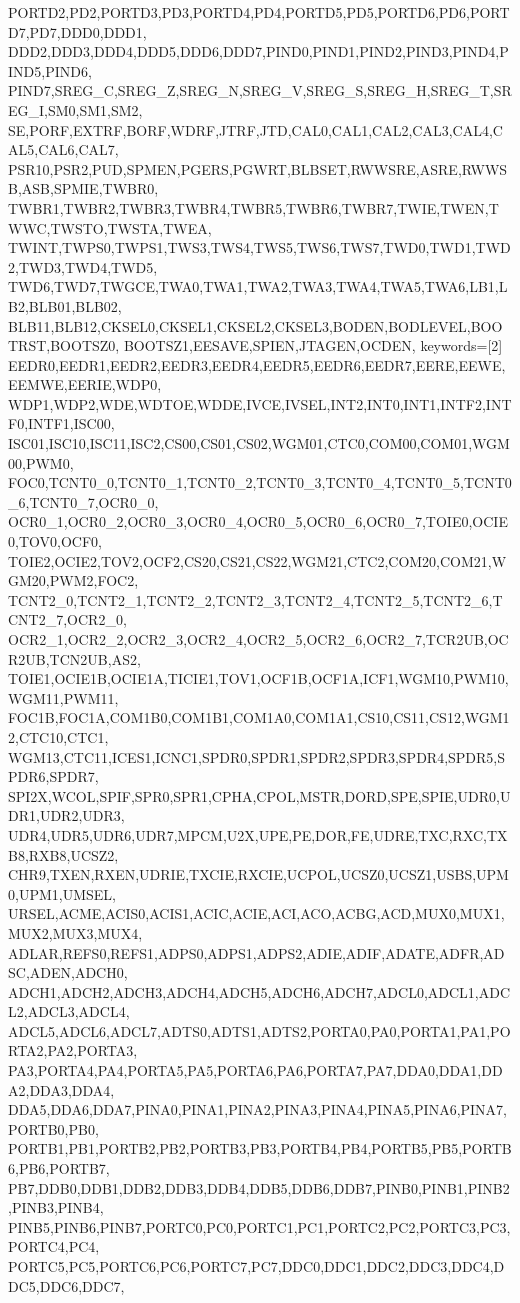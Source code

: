{{    PORTD2,PD2,PORTD3,PD3,PORTD4,PD4,PORTD5,PD5,PORTD6,PD6,PORTD7,PD7,DDD0,DDD1,
    DDD2,DDD3,DDD4,DDD5,DDD6,DDD7,PIND0,PIND1,PIND2,PIND3,PIND4,PIND5,PIND6,
    PIND7,SREG_C,SREG_Z,SREG_N,SREG_V,SREG_S,SREG_H,SREG_T,SREG_I,SM0,SM1,SM2,
    SE,PORF,EXTRF,BORF,WDRF,JTRF,JTD,CAL0,CAL1,CAL2,CAL3,CAL4,CAL5,CAL6,CAL7,
    PSR10,PSR2,PUD,SPMEN,PGERS,PGWRT,BLBSET,RWWSRE,ASRE,RWWSB,ASB,SPMIE,TWBR0,
    TWBR1,TWBR2,TWBR3,TWBR4,TWBR5,TWBR6,TWBR7,TWIE,TWEN,TWWC,TWSTO,TWSTA,TWEA,
    TWINT,TWPS0,TWPS1,TWS3,TWS4,TWS5,TWS6,TWS7,TWD0,TWD1,TWD2,TWD3,TWD4,TWD5,
    TWD6,TWD7,TWGCE,TWA0,TWA1,TWA2,TWA3,TWA4,TWA5,TWA6,LB1,LB2,BLB01,BLB02,
    BLB11,BLB12,CKSEL0,CKSEL1,CKSEL2,CKSEL3,BODEN,BODLEVEL,BOOTRST,BOOTSZ0,
    BOOTSZ1,EESAVE,SPIEN,JTAGEN,OCDEN},
    keywords=[2]
    {EEDR0,EEDR1,EEDR2,EEDR3,EEDR4,EEDR5,EEDR6,EEDR7,EERE,EEWE,EEMWE,EERIE,WDP0,
    WDP1,WDP2,WDE,WDTOE,WDDE,IVCE,IVSEL,INT2,INT0,INT1,INTF2,INTF0,INTF1,ISC00,
    ISC01,ISC10,ISC11,ISC2,CS00,CS01,CS02,WGM01,CTC0,COM00,COM01,WGM00,PWM0,
    FOC0,TCNT0_0,TCNT0_1,TCNT0_2,TCNT0_3,TCNT0_4,TCNT0_5,TCNT0_6,TCNT0_7,OCR0_0,
    OCR0_1,OCR0_2,OCR0_3,OCR0_4,OCR0_5,OCR0_6,OCR0_7,TOIE0,OCIE0,TOV0,OCF0,
    TOIE2,OCIE2,TOV2,OCF2,CS20,CS21,CS22,WGM21,CTC2,COM20,COM21,WGM20,PWM2,FOC2,
    TCNT2_0,TCNT2_1,TCNT2_2,TCNT2_3,TCNT2_4,TCNT2_5,TCNT2_6,TCNT2_7,OCR2_0,
    OCR2_1,OCR2_2,OCR2_3,OCR2_4,OCR2_5,OCR2_6,OCR2_7,TCR2UB,OCR2UB,TCN2UB,AS2,
    TOIE1,OCIE1B,OCIE1A,TICIE1,TOV1,OCF1B,OCF1A,ICF1,WGM10,PWM10,WGM11,PWM11,
    FOC1B,FOC1A,COM1B0,COM1B1,COM1A0,COM1A1,CS10,CS11,CS12,WGM12,CTC10,CTC1,
    WGM13,CTC11,ICES1,ICNC1,SPDR0,SPDR1,SPDR2,SPDR3,SPDR4,SPDR5,SPDR6,SPDR7,
    SPI2X,WCOL,SPIF,SPR0,SPR1,CPHA,CPOL,MSTR,DORD,SPE,SPIE,UDR0,UDR1,UDR2,UDR3,
    UDR4,UDR5,UDR6,UDR7,MPCM,U2X,UPE,PE,DOR,FE,UDRE,TXC,RXC,TXB8,RXB8,UCSZ2,
    CHR9,TXEN,RXEN,UDRIE,TXCIE,RXCIE,UCPOL,UCSZ0,UCSZ1,USBS,UPM0,UPM1,UMSEL,
    URSEL,ACME,ACIS0,ACIS1,ACIC,ACIE,ACI,ACO,ACBG,ACD,MUX0,MUX1,MUX2,MUX3,MUX4,
    ADLAR,REFS0,REFS1,ADPS0,ADPS1,ADPS2,ADIE,ADIF,ADATE,ADFR,ADSC,ADEN,ADCH0,
    ADCH1,ADCH2,ADCH3,ADCH4,ADCH5,ADCH6,ADCH7,ADCL0,ADCL1,ADCL2,ADCL3,ADCL4,
    ADCL5,ADCL6,ADCL7,ADTS0,ADTS1,ADTS2,PORTA0,PA0,PORTA1,PA1,PORTA2,PA2,PORTA3,
    PA3,PORTA4,PA4,PORTA5,PA5,PORTA6,PA6,PORTA7,PA7,DDA0,DDA1,DDA2,DDA3,DDA4,
    DDA5,DDA6,DDA7,PINA0,PINA1,PINA2,PINA3,PINA4,PINA5,PINA6,PINA7,PORTB0,PB0,
    PORTB1,PB1,PORTB2,PB2,PORTB3,PB3,PORTB4,PB4,PORTB5,PB5,PORTB6,PB6,PORTB7,
    PB7,DDB0,DDB1,DDB2,DDB3,DDB4,DDB5,DDB6,DDB7,PINB0,PINB1,PINB2,PINB3,PINB4,
    PINB5,PINB6,PINB7,PORTC0,PC0,PORTC1,PC1,PORTC2,PC2,PORTC3,PC3,PORTC4,PC4,
    PORTC5,PC5,PORTC6,PC6,PORTC7,PC7,DDC0,DDC1,DDC2,DDC3,DDC4,DDC5,DDC6,DDC7,
}}

